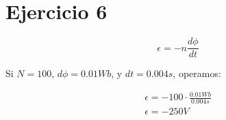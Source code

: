 \section{Ejercicio 6}

\begin{equation*}
    \epsilon = -n \frac{d\phi}{dt}
\end{equation*}

Si \(N = 100\),
\(d\phi = 0.01 Wb\),
y \(dt = 0.004 s\), operamos:

\begin{align*}
    \epsilon = -100 \cdot \frac{0.01Wb}{0.004s} \\
    \epsilon = \boxed{-250V}
\end{align*}